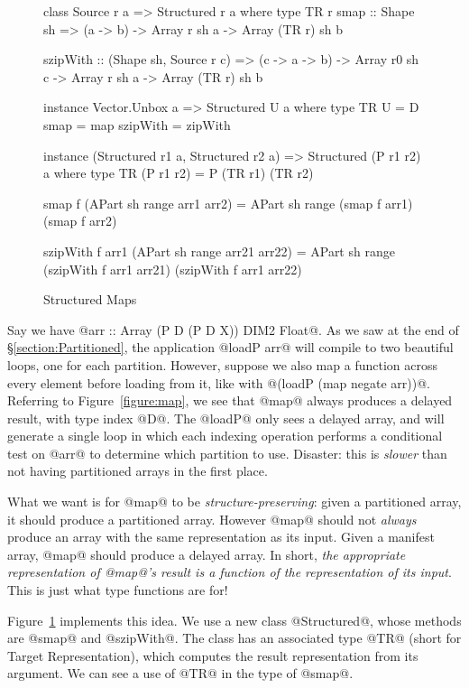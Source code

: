 \begin{figure}
\begin{small}
\begin{code}
class Source r a => Structured r a where
  type TR r
  smap     :: Shape sh 
           => (a -> b) 
           -> Array r sh a -> Array (TR r) sh b

  szipWith :: (Shape sh, Source r c)
           => (c -> a -> b) 
           -> Array r0 sh c  -> Array r sh a
           -> Array (TR r) sh b

instance Vector.Unbox a => Structured U a where
  type TR U = D
  smap      = map
  szipWith  = zipWith

instance (Structured r1 a, Structured r2 a)
       => Structured (P r1 r2) a where
  type TR (P r1 r2) = P (TR r1) (TR r2)

  smap f (APart sh range arr1 arr2)
        = APart sh range (smap f arr1) (smap f arr2)

  szipWith f arr1 (APart sh range arr21 arr22)
        = APart sh range (szipWith f arr1 arr21)
                         (szipWith f arr1 arr22)
\end{code}
\end{small}
\caption{Structured Maps}
\label{figure:Structured}
\end{figure}

Say we have @arr :: Array (P D (P D X)) DIM2 Float@. As we saw at the end of \S\ref{section:Partitioned}, the application @loadP arr@ will compile to two beautiful loops, one for each partition. However, suppose we also map a function across every element before loading from it, like with @(loadP (map negate arr))@. Referring to Figure~\ref{figure:map}, we see that @map@ always produces a delayed result, with type index @D@. The @loadP@ only sees a delayed array, and will generate a single loop in which each indexing operation performs a conditional test on @arr@ to determine which partition to use. Disaster: this is \emph{slower} than not having partitioned arrays in the first place.

What we want is for @map@ to be \emph{structure-preserving}: given a partitioned array, it should produce a partitioned array. However @map@ should not \emph{always} produce an array with the same representation as its input. Given a manifest array, @map@ should produce a delayed array. In short, \emph{the appropriate representation of @map@'s result is a function of the representation of its input}.  This is just what type functions are for!

Figure~\ref{figure:Structured} implements this idea. We use a new class @Structured@, whose methods are @smap@ and @szipWith@. The class has an associated type @TR@ (short for Target Representation), which computes the result representation from its argument. We can see a use of @TR@ in the type of @smap@. 

